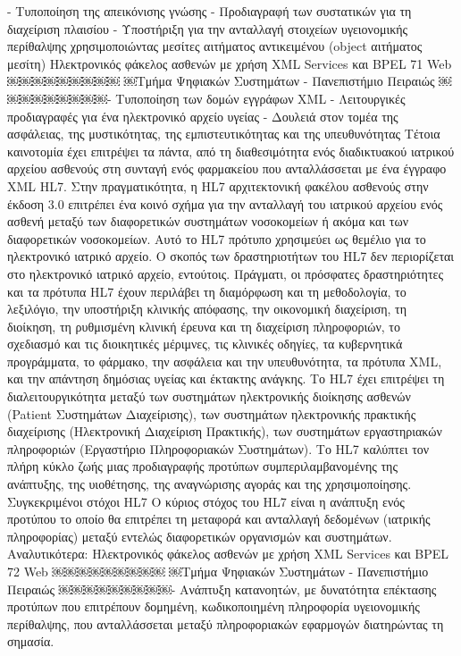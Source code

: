 - Τυποποίηση της απεικόνισης γνώσης
- Προδιαγραφή των συστατικών για τη διαχείριση πλαισίου
- Υποστήριξη για την ανταλλαγή στοιχείων υγειονομικής περίθαλψης χρησιμοποιώντας
μεσίτες αιτήματος αντικειμένου (object αιτήματος μεσίτη)
Ηλεκτρονικός φάκελος ασθενών με χρήση XML Services και BPEL 71 Web
￼￼￼￼￼￼￼￼￼
￼Τμήμα Ψηφιακών Συστημάτων - Πανεπιστήμιο Πειραιώς
￼￼￼￼￼￼￼￼￼- Τυποποίηση των δομών εγγράφων XML
- Λειτουργικές προδιαγραφές για ένα ηλεκτρονικό αρχείο υγείας
- Δουλειά στον τομέα της ασφάλειας, της μυστικότητας, της εμπιστευτικότητας και της
υπευθυνότητας
Τέτοια καινοτομία έχει επιτρέψει τα πάντα, από τη διαθεσιμότητα ενός διαδικτυακού ιατρικού αρχείου ασθενούς στη συνταγή ενός φαρμακείου που ανταλλάσσεται με ένα έγγραφο XML HL7. Στην πραγματικότητα, η HL7 αρχιτεκτονική φακέλου ασθενούς στην έκδοση 3.0 επιτρέπει ένα κοινό σχήμα για την ανταλλαγή του ιατρικού αρχείου ενός ασθενή μεταξύ των διαφορετικών συστημάτων νοσοκομείων ή ακόμα και των διαφορετικών νοσοκομείων. Αυτό το HL7 πρότυπο χρησιμεύει ως θεμέλιο για το ηλεκτρονικό ιατρικό αρχείο.
Ο σκοπός των δραστηριοτήτων του HL7 δεν περιορίζεται στο ηλεκτρονικό ιατρικό αρχείο, εντούτοις. Πράγματι, οι πρόσφατες δραστηριότητες και τα πρότυπα HL7 έχουν περιλάβει τη διαμόρφωση και τη μεθοδολογία, το λεξιλόγιο, την υποστήριξη κλινικής απόφασης, την οικονομική διαχείριση, τη διοίκηση, τη ρυθμισμένη κλινική έρευνα και τη διαχείριση πληροφοριών, το σχεδιασμό και τις διοικητικές μέριμνες, τις κλινικές οδηγίες, τα κυβερνητικά προγράμματα, το φάρμακο, την ασφάλεια και την υπευθυνότητα, τα πρότυπα XML, και την απάντηση δημόσιας υγείας και έκτακτης ανάγκης.
Το HL7 έχει επιτρέψει τη διαλειτουργικότητα μεταξύ των συστημάτων ηλεκτρονικής διοίκησης ασθενών (Patient Συστημάτων Διαχείρισης), των συστημάτων ηλεκτρονικής πρακτικής διαχείρισης (Ηλεκτρονική Διαχείριση Πρακτικής), των συστημάτων εργαστηριακών πληροφοριών (Εργαστήριο Πληροφοριακών Συστημάτων). Το HL7 καλύπτει τον πλήρη κύκλο ζωής μιας προδιαγραφής προτύπων συμπεριλαμβανομένης της ανάπτυξης, της υιοθέτησης, της αναγνώρισης αγοράς και της χρησιμοποίησης.
Συγκεκριμένοι στόχοι HL7
Ο κύριος στόχος του HL7 είναι η ανάπτυξη ενός προτύπου το οποίο θα επιτρέπει τη μεταφορά και ανταλλαγή δεδομένων (ιατρικής πληροφορίας) μεταξύ εντελώς διαφορετικών οργανισμών και συστημάτων. Αναλυτικότερα:
Ηλεκτρονικός φάκελος ασθενών με χρήση XML Services και BPEL 72 Web
￼￼￼￼￼￼￼￼￼
￼Τμήμα Ψηφιακών Συστημάτων - Πανεπιστήμιο Πειραιώς
￼￼￼￼￼￼￼￼￼- Ανάπτυξη κατανοητών, με δυνατότητα επέκτασης προτύπων που επιτρέπουν δομημένη, κωδικοποιημένη πληροφορία υγειονομικής περίθαλψης, που ανταλλάσσεται μεταξύ πληροφοριακών εφαρμογών διατηρώντας τη σημασία.
